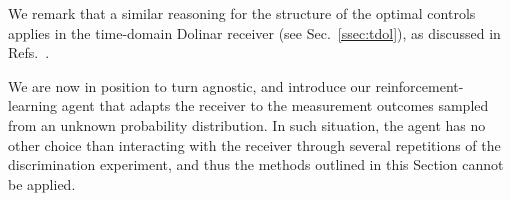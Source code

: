 We remark that a similar reasoning for the structure of the optimal controls applies in the time-domain Dolinar receiver (see Sec.~\ref{ssec:tdol}), as discussed in Refs.~\cite{Dolinar, Takeoka2005, revisiting2011Assalini}.

We are now in position to turn agnostic, and introduce our reinforcement-learning agent that adapts the receiver to the measurement outcomes sampled from an unknown probability distribution. In such situation, the agent has no other choice than interacting with the receiver through several repetitions of the discrimination experiment, and thus the methods outlined in this Section cannot be applied.

